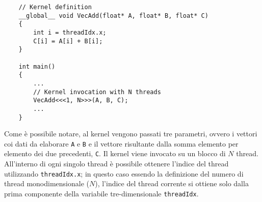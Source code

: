 \begin{lstlisting}
    // Kernel definition
    __global__ void VecAdd(float* A, float* B, float* C)
    {
        int i = threadIdx.x;
        C[i] = A[i] + B[i];
    }

    int main()
    {
        ...
        // Kernel invocation with N threads
        VecAdd<<<1, N>>>(A, B, C);
        ...
    }
\end{lstlisting}

Come è possibile notare, al kernel vengono passati tre parametri, ovvero i vettori coi dati da elaborare \lstinline{A} e \lstinline{B} e il vettore risultante dalla somma elemento per elemento dei due precedenti, \lstinline{C}. Il kernel viene invocato su un blocco di $N$ thread. All'interno di ogni singolo thread è possibile ottenere l'indice del thread utilizzando \lstinline{threadIdx.x}; in questo caso essendo la definizione del numero di thread monodimensionale ($N$), l'indice del thread corrente si ottiene solo dalla prima componente della variabile tre-dimensionale \lstinline{threadIdx}.